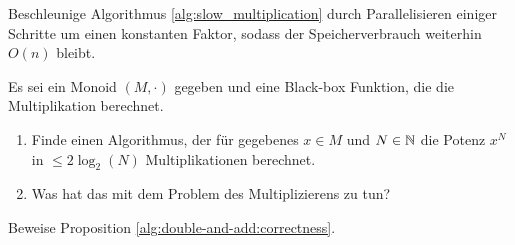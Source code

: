 
\begin{sheet}

\begin{problem}[title={Parallelisierung}]
Beschleunige Algorithmus \ref{alg:slow_multiplication} durch Parallelisieren einiger Schritte um einen konstanten Faktor, sodass der Speicherverbrauch weiterhin $O(n)$ bleibt.
\end{problem}

\begin{problem}[title={Square-and-multiply}]
Es sei ein Monoid $(M,\cdot)$ gegeben und eine Black-box Funktion, die die Multiplikation berechnet.

\begin{enumerate}
\item Finde einen Algorithmus, der für gegebenes $x\in M$ und $N\in\mathbb{N}$ die Potenz $x^N$ in $\leq 2\log_2(N)$ Multiplikationen berechnet.
\item Was hat das mit dem Problem des Multiplizierens zu tun?
\end{enumerate}
\end{problem}

\begin{problem}
Beweise Proposition \ref{alg:double-and-add:correctness}.
\end{problem}

\end{sheet}
